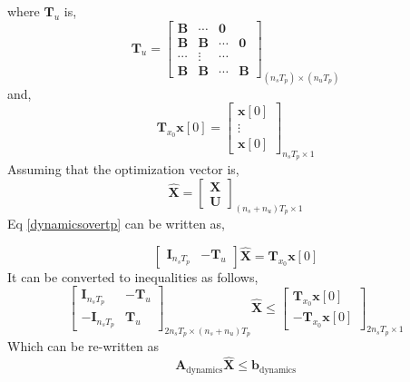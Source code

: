\documentclass{article}
\begin{document}
where $\mathbf{T}_u$ is,
\[
\mathbf{T}_u=
  \begin{bmatrix}
    \mathbf{B} & \cdots & \mathbf{0} \\
    \mathbf{B} & \mathbf{B} & \cdots & \mathbf{0}\\
    \cdots & \vdots & \cdots\\
    \mathbf{B} & \mathbf{B} & \cdots & \mathbf{B}
  \end{bmatrix}_{(n_s T_p) \times (n_u T_p)}
\]
and,
\[
\mathbf{T}_{x_0}\mathbf{x}[0]=
\begin{bmatrix}
\mathbf{x}[0]\\
\vdots \\
\mathbf{x}[0]
\end{bmatrix}_{n_s T_p \times 1}
\]
Assuming that the optimization vector is,
\begin{equation}
\label{optimizationvector}
\hat{\mathbf{X}} = 
\begin{bmatrix}
\mathbf{X} \\
\mathbf{U}
\end{bmatrix}_{(n_s+n_u)T_p \times 1}
\end{equation}
Eq \ref{dynamicsovertp} can be written as, 

\begin{equation}
\begin{bmatrix}
\mathbf{I}_{n_s T_p} & -\mathbf{T}_u
\end{bmatrix}
\hat{\mathbf{X}} = \mathbf{T}_{x_0}\mathbf{x}[0]
\end{equation}
It can be converted to inequalities as follows,
\begin{equation}
\label{comapctdynamicsconstraints}
\begin{bmatrix}
\mathbf{I}_{n_s T_p} & -\mathbf{T}_u\\
-\mathbf{I}_{n_s T_p} & \mathbf{T}_u
\end{bmatrix}_{2n_s T_p \times (n_s+n_u)T_p}
\hat{\mathbf{X}}
\leq
\begin{bmatrix}
\mathbf{T}_{x_0}\mathbf{x}[0]\\
-\mathbf{T}_{x_0}\mathbf{x}[0]
\end{bmatrix}_{2n_s T_p \times 1}
\end{equation}
Which can be re-written as 
\[
\mathbf{A}_{\text{dynamics}} \hat{\mathbf{X}} \leq \mathbf{b}_{\text{dynamics}}
\]
\end{document}

